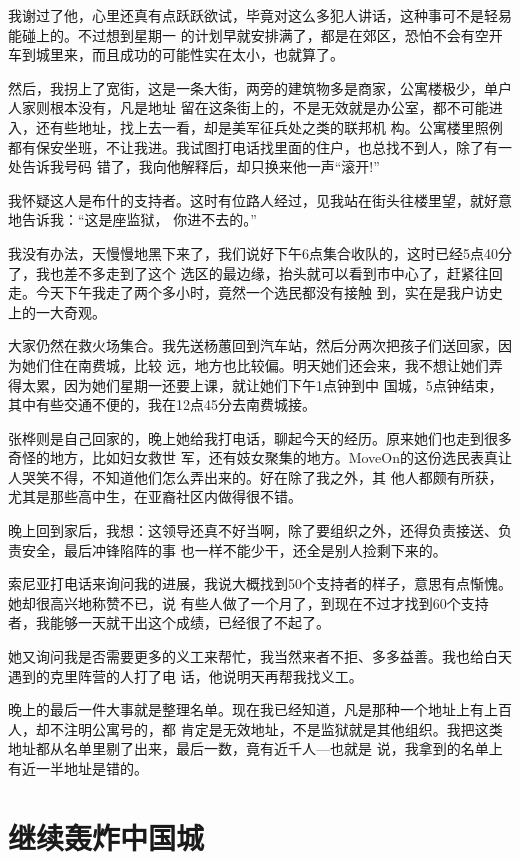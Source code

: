 ﻿\documentclass[11pt]{article}
\begin{document}
我谢过了他，心里还真有点跃跃欲试，毕竟对这么多犯人讲话，这种事可不是轻易能碰上的。不过想到星期一
的计划早就安排满了，都是在郊区，恐怕不会有空开车到城里来，而且成功的可能性实在太小，也就算了。

然后，我拐上了宽街，这是一条大街，两旁的建筑物多是商家，公寓楼极少，单户人家则根本没有，凡是地址
留在这条街上的，不是无效就是办公室，都不可能进入，还有些地址，找上去一看，却是美军征兵处之类的联邦机
构。公寓楼里照例都有保安坐班，不让我进。我试图打电话找里面的住户，也总找不到人，除了有一处告诉我号码
错了，我向他解释后，却只换来他一声``滚开!''


我怀疑这人是布什的支持者。这时有位路人经过，见我站在街头往楼里望，就好意地告诉我：``这是座监狱，
你进不去的。''

我没有办法，天慢慢地黑下来了，我们说好下午6点集合收队的，这时已经5点40分了，我也差不多走到了这个
选区的最边缘，抬头就可以看到市中心了，赶紧往回走。今天下午我走了两个多小时，竟然一个选民都没有接触
到，实在是我户访史上的一大奇观。

大家仍然在救火场集合。我先送杨蕙回到汽车站，然后分两次把孩子们送回家，因为她们住在南费城，比较
远，地方也比较偏。明天她们还会来，我不想让她们弄得太累，因为她们星期一还要上课，就让她们下午1点钟到中
国城，5点钟结束，其中有些交通不便的，我在12点45分去南费城接。

张桦则是自己回家的，晚上她给我打电话，聊起今天的经历。原来她们也走到很多奇怪的地方，比如妇女救世
军，还有妓女聚集的地方。MoveOn的这份选民表真让人哭笑不得，不知道他们怎么弄出来的。好在除了我之外，其
他人都颇有所获，尤其是那些高中生，在亚裔社区内做得很不错。

晚上回到家后，我想：这领导还真不好当啊，除了要组织之外，还得负责接送、负责安全，最后冲锋陷阵的事
也一样不能少干，还全是别人捡剩下来的。

索尼亚打电话来询问我的进展，我说大概找到50个支持者的样子，意思有点惭愧。她却很高兴地称赞不已，说
有些人做了一个月了，到现在不过才找到60个支持者，我能够一天就干出这个成绩，已经很了不起了。

她又询问我是否需要更多的义工来帮忙，我当然来者不拒、多多益善。我也给白天遇到的克里阵营的人打了电
话，他说明天再帮我找义工。

晚上的最后一件大事就是整理名单。现在我已经知道，凡是那种一个地址上有上百人，却不注明公寓号的，都
肯定是无效地址，不是监狱就是其他组织。我把这类地址都从名单里剔了出来，最后一数，竟有近千人---也就是
说，我拿到的名单上有近一半地址是错的。

\section{继续轰炸中国城}
\end{document}
